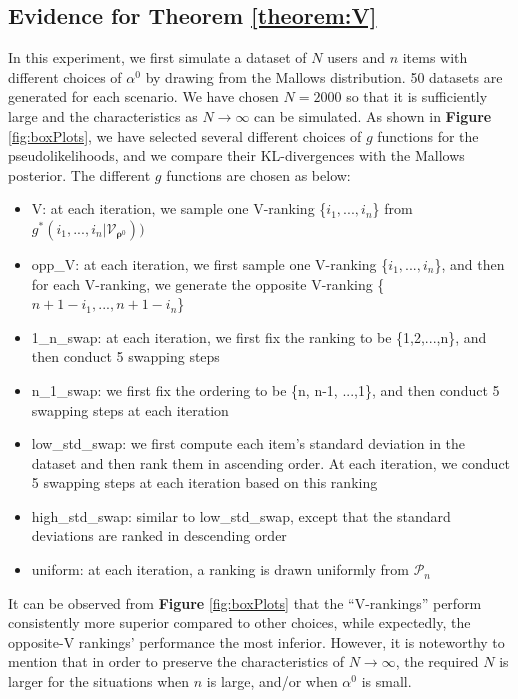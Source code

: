 \documentclass[11pt, oneside]{article}   	%
\begin{document}
\subsection{Evidence for Theorem \ref{theorem:V}}
In this experiment, we first simulate a dataset of $N$ users and $n$ items with different choices of $\alpha^0$ by drawing from the Mallows distribution.  50 datasets are generated for each scenario. We have chosen $N = 2000$ so that it is sufficiently large and the characteristics as $N \rightarrow \infty$ can be simulated. As shown in \textbf{Figure} \ref{fig:boxPlots}, we have selected several different choices of $g$ functions for the pseudolikelihoods, and we compare their KL-divergences with the Mallows posterior. The different $g$ functions are chosen as below:
\begin{itemize}
	\item {V: at each iteration, we sample one V-ranking \{$i_1, ...,i_n$\} from $g^*(i_1, ..., i_n | \mathcal{V}_{\bm{\rho}^0}))$}
	\item {opp\_V: at each iteration, we first sample one V-ranking \{$i_1, ...,i_n$\}, and then for each V-ranking, we generate the opposite V-ranking \{$n+1 - i_1, ..., n+1 - i_n$\}}
	\item {1\_n\_swap: at each iteration, we first fix the ranking to be \{1,2,...,n\}, and then conduct 5 swapping steps}
	\item {n\_1\_swap: we first fix the ordering to be \{n, n-1, ...,1\}, and then conduct 5 swapping steps at each iteration}
	\item {low\_std\_swap: we first compute each item's standard deviation in the dataset and then rank them in ascending order. At each iteration, we conduct 5 swapping steps at each iteration based on this ranking }
	\item {high\_std\_swap: similar to low\_std\_swap, except that the standard deviations are ranked in descending order}
	\item{uniform: at each iteration, a ranking is drawn uniformly from $\mathcal{P}_n$}
\end{itemize}

It can be observed from \textbf{Figure} \ref{fig:boxPlots} that the ``V-rankings'' perform consistently more superior compared to other choices, while expectedly, the opposite-V rankings' performance the most inferior. However, it is noteworthy to mention that in order to preserve the characteristics of $N \rightarrow \infty$, the required $N$ is larger for the situations when $n$ is large, and/or when $\alpha^0$ is small.
\end{document}
